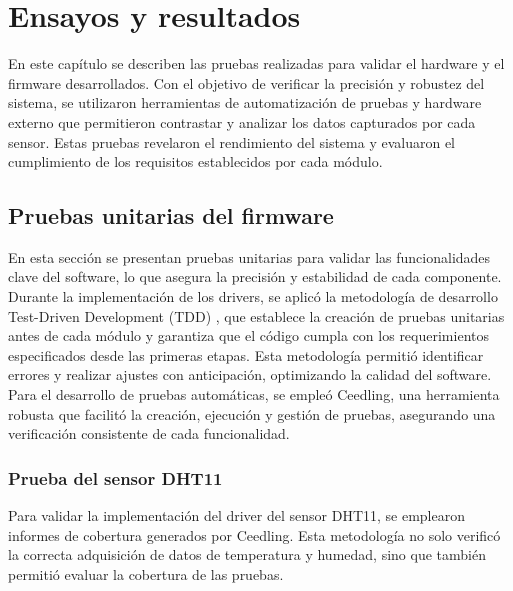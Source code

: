 
\chapter{Ensayos y resultados} %

\label{Chapter4} %

En este capítulo se describen las pruebas realizadas para validar el hardware y el firmware desarrollados. Con el objetivo de verificar la precisión y robustez del sistema, se utilizaron herramientas de automatización de pruebas y hardware externo que permitieron contrastar y analizar los datos capturados por cada sensor. Estas pruebas revelaron el rendimiento del sistema y evaluaron el cumplimiento de los requisitos establecidos por cada módulo.


\section{Pruebas unitarias del firmware}
\label{sec:pruebas_unitarias}

En esta sección se presentan pruebas unitarias para validar las funcionalidades clave del software, lo que asegura la precisión y estabilidad de cada componente. Durante la implementación de los drivers, se aplicó la metodología de desarrollo Test-Driven Development (TDD) \citep{ieee2023}, que establece la creación de pruebas unitarias antes de cada módulo y garantiza que el código cumpla con los requerimientos especificados desde las primeras etapas. Esta metodología permitió identificar errores y realizar ajustes con anticipación, optimizando la calidad del software. Para el desarrollo de pruebas automáticas, se empleó Ceedling, una herramienta robusta que facilitó la creación, ejecución y gestión de pruebas, asegurando una verificación consistente de cada funcionalidad.

\subsection{Prueba del sensor DHT11}
Para validar la implementación del driver del sensor DHT11, se emplearon informes de cobertura generados por Ceedling. Esta metodología no solo verificó la correcta adquisición de datos de temperatura y humedad, sino que también permitió evaluar la cobertura de las pruebas.

